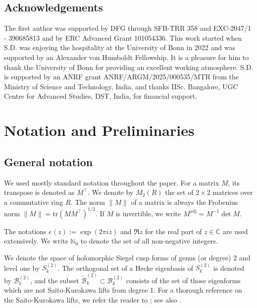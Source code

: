 \documentclass[11pt]{amsart}
\numberwithin{equation}{section}
\theoremstyle{plain}
\theoremstyle{definition}
\numberwithin{equation}{section}
\begin{document}

\subsection{Acknowledgements}
The   first author was supported by DFG through SFB-TRR 358 and EXC-2047/1 - 390685813 and by ERC Advanced Grant 101054336. This work started when S.D. was enjoying the hospitality at the University of Bonn in 2022 and was supported by an Alexander von Humboldt Fellowship. It is a pleasure for him to thank the University of Bonn for providing an excellent working atmosphere.
S.D. is supported by an ANRF grant ANRF/ARGM/2025/000535/MTR from the Ministry of Science and Technology, India, and thanks IISc. Bangalore, UGC Centre for Advanced Studies, DST, India, for financial support.

\section{Notation and Preliminaries}

\subsection{General notation}
We used mostly standard notation throughout the paper. For a matrix $M$, its transpose is denoted as $M^\top$. We denote by $M_2(R)$ the set of $2 \times 2$ matrices over a commutative ring $R$. The norm $\| M \|$ of a matrix is always the Frobenius norm $\| M \| = \text{tr}(MM^{\top})^{1/2}.$ If $M$ is invertible, we write $M^{\text{adj}} = M^{-1} \det M$.  

The notations $e(z):= \exp(2 \pi i z)$ and $\Re z$ for the real part of $z \in \mathbb{C}$ are used extensively. We write $\mathbb{N}_0$ to denote the set of all non-negative integers.

We denote the space of holomorphic Siegel cusp forms of genus (or degree) $2$ and level one by $S^{(2)}_k$. The orthogonal set of a Hecke eigenbasis of $S^{(2)}_k$ is denoted by $\mathcal{B}_k^{(2)}$, and the subset $\mathcal{\tilde B}_k^{(2)} \subset \mathcal{B}_k^{(2)}$ consists of the set of those eigenforms which are not Saito-Kurokawa lifts from degree $1$. For a thorough reference on the Saito-Kurokawa lifts, we refer the reader to \cite{FPRS}; see also \cite[Section~7.3]{DK}.
\end{document}
